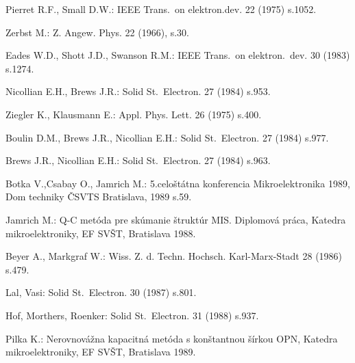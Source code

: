 \begin{thebibliography}{}

Pierret R.F., Small D.W.: IEEE Trans.\ on elektron.dev. 22 (1975) s.1052.

Zerbst M.: Z. Angew. Phys. 22 (1966), s.30.

Eades W.D., Shott J.D., Swanson R.M.: IEEE Trans.\ on elektron.\ dev. 30 (1983) s.1274.

Nicollian E.H., Brews J.R.: Solid St.\ Electron.  27 (1984) s.953.

Ziegler K., Klausmann E.: Appl. Phys. Lett. 26 (1975) s.400.

Boulin D.M., Brews J.R., Nicollian E.H.: Solid St.\ Electron. 27  (1984) s.977.

Brews J.R., Nicollian E.H.: Solid  St.\ Electron. 27 (1984) s.963.

Botka V.,Csabay O., Jamrich M.: 5.celoštátna konferencia Mikroelektronika 1989, Dom techniky ČSVTS Bratislava, 1989 s.59.

Jamrich M.: Q-C metóda pre skúmanie štruktúr MIS\@. Diplomová práca, Katedra mikroelektroniky, EF SVŠT, Bratislava 1988.

Beyer A., Markgraf W.: Wiss. Z. d. Techn. Hochsch. Karl-Marx-Stadt 28 (1986) s.479.

Lal, Vasi: Solid St.\ Electron. 30 (1987) s.801.

Hof, Morthers, Roenker: Solid St.\ Electron. 31 (1988) s.937.

Pilka K.: Nerovnovážna kapacitná metóda s konštantnou šírkou OPN, Katedra mikroelektroniky, EF SVŠT, Bratislava 1989.

\end{thebibliography}
